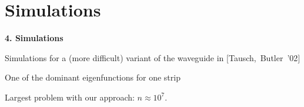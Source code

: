 \documentclass[10pt]{beamer}
\newcommand{\mycite}[1]{$[$#1$]$}
\begin{document}
\section{Simulations}
\begin{frame}
\begin{center}
\Large
\bf 4. Simulations\\\vspace{0.5cm}
\end{center}
\end{frame}
\begin{frame}
Simulations for a (more difficult) variant of the waveguide in \mycite{Tausch,~Butler~'02}
\begin{center}%
%
\end{center}\pause
One of the dominant eigenfunctions for one strip
\\\pause

\hfill Largest problem with our approach: $n\approx 10^7$.
\end{frame}
\end{document}

